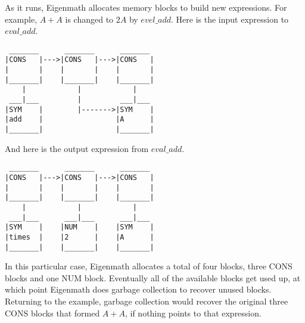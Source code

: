 \noindent
As it runs, Eigenmath allocates memory blocks to build new expressions.
For example, $A+A$ is changed to $2A$ by $evel\_add$.
Here is the input expression to $eval\_add$.
\begin{verbatim}
 _______      _______      _______
|CONS   |--->|CONS   |--->|CONS   |
|       |    |       |    |       |
|_______|    |_______|    |_______|
    |            |            |
 ___|___         |         ___|___
|SYM    |        |------->|SYM    |
|add    |                 |A      |
|_______|                 |_______|
\end{verbatim}

\bigskip
\noindent
And here is the output expression from $eval\_add$.
\begin{verbatim}
 _______      _______      _______
|CONS   |--->|CONS   |--->|CONS   |
|       |    |       |    |       |
|_______|    |_______|    |_______|
    |            |            |
 ___|___      ___|___      ___|___
|SYM    |    |NUM    |    |SYM    |
|times  |    |2      |    |A      |
|_______|    |_______|    |_______|
\end{verbatim}

\bigskip
\noindent
In this particular case, Eigenmath allocates a total of four blocks,
three CONS blocks and one NUM block.
Eventually all of the available blocks get used up, at which point Eigenmath
does garbage collection to recover unused blocks.
Returning to the example, garbage collection would recover the original
three CONS blocks that formed $A+A$, if nothing points to that expression.
